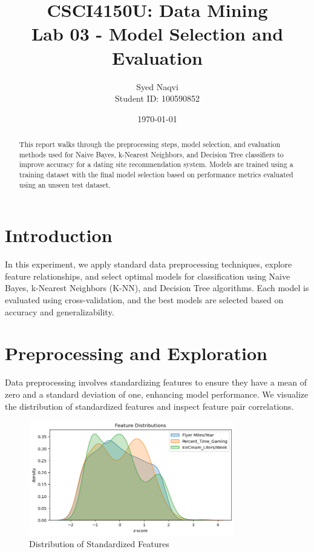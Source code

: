 \documentclass{article}
\title{\textbf{CSCI4150U: Data Mining}\\Lab 03 - Model Selection and Evaluation}
\author{Syed Naqvi \\ Student ID: 100590852}
\date{\today}
\begin{document}
\maketitle

\begin{abstract}
This report walks through the preprocessing steps, model selection, and evaluation methods used for Naive Bayes,
k-Nearest Neighbors, and Decision Tree classifiers to improve accuracy for a dating site recommendation system.
Models are trained using a training dataset with the final model selection based on performance metrics evaluated
using an unseen test dataset.
\end{abstract}

\section{Introduction}
In this experiment, we apply standard data preprocessing techniques, explore feature relationships, and select optimal models for classification using Naive Bayes, k-Nearest Neighbors (K-NN), and Decision Tree algorithms. Each model is evaluated using cross-validation, and the best models are selected based on accuracy and generalizability.

\section{Preprocessing and Exploration}
Data preprocessing involves standardizing features to ensure they have a mean of zero and a standard deviation of one, enhancing model performance. We visualize the distribution of standardized features and inspect feature pair correlations.

\begin{figure}[H]
    \centering
    \includegraphics[width=0.8\textwidth]{pre_a.png}
    \caption{Distribution of Standardized Features}
    \label{fig:standardized-distribution}
\end{figure}
\end{document}
